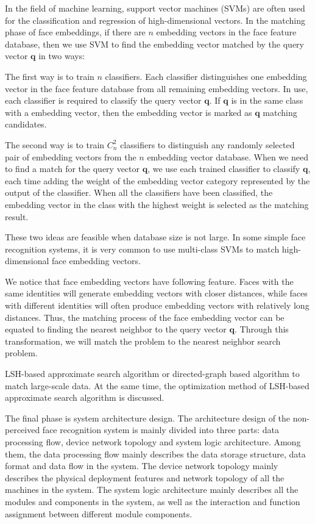 \begin{bigabstract}
In the field of machine learning, support vector machines (SVMs) are often used for the classification and regression of high-dimensional vectors. In the matching phase of face embeddings, if there are $n$ embedding vectors in the face feature database, then we use SVM to find the embedding vector matched by the query vector $\mathbf{q}$ in two ways:

The first way is to train $n$ classifiers. Each classifier distinguishes one embedding vector in the face feature database from all remaining embedding vectors. In use, each classifier is required to classify the query vector $\mathbf{q}$. If $\mathbf{q}$ is in the same class with a embedding vector, then the embedding vector is marked as $\mathbf{q}$ matching candidates.

The second way is to train $C_n^2$ classifiers to distinguish any randomly selected pair of embedding vectors from the $n$ embedding vector database. When we need to find a match for the query vector $\mathbf{q}$, we use each trained classifier to classify $\mathbf{q}$, each time adding the weight of the embedding vector category represented by the output of the classifier. When all the classifiers have been classified, the embedding vector in the class with the highest weight is selected as the matching result.

These two ideas are feasible when database size is not large. In some simple face recognition systems, it is very common to use multi-class SVMs to match high-dimensional face embedding vectors.

We notice that face embedding vectors have following feature. Faces with the same identities will generate embedding vectors with closer distances, while faces with different identities will often produce embedding vectors with relatively long distances. Thus, the matching process of the face embedding vector can be equated to finding the nearest neighbor to the query vector $\mathbf{q}$. Through this transformation, we will match the problem to the nearest neighbor search problem.

LSH-based approximate search algorithm or directed-graph based algorithm to match large-scale data. At the same time, the optimization method of LSH-based approximate search algorithm is discussed.

The final phase is system architecture design. The architecture design of the non-perceived face recognition system is mainly divided into three parts: data processing flow, device network topology and system logic architecture. Among them, the data processing flow mainly describes the data storage structure, data format and data flow in the system. The device network topology mainly describes the physical deployment features and network topology of all the machines in the system. The system logic architecture mainly describes all the modules and components in the system, as well as the interaction and function assignment between different module components.


\end{bigabstract}

